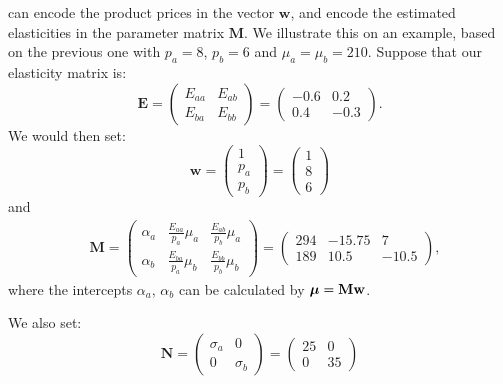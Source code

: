 \documentclass[a4paper,11pt]{article}
\begin{document}
can encode the product prices in the vector $\mathbf{w}$, and encode the estimated elasticities in the parameter matrix $\mathbf{M}$. We illustrate this on an example, based on the previous one with $p_a = 8$, $p_b = 6$ and $\mu_a = \mu_b = 210$. Suppose that our elasticity matrix is:
\[
\mathbf{E} = 
\begin{pmatrix} E_{aa} & E_{ab}\\ E_{ba} & E_{bb} \end{pmatrix}
=
\begin{pmatrix} -0.6 & 0.2\\ 0.4 & -0.3 \end{pmatrix}.
\]
We would then set:
\[
\mathbf{w} = 
\begin{pmatrix} 1\\ p_a\\ p_b \end{pmatrix} =
\begin{pmatrix} 1\\ 8\\ 6 \end{pmatrix}
\]
and
\[
\begin{aligned}
&\mathbf{M} = 
\begin{pmatrix}
\alpha_a&\frac{E_{aa}}{p_a}\mu_a&\frac{E_{ab}}{p_b}\mu_a\\
\alpha_b&\frac{E_{ba}}{p_a}\mu_b&\frac{E_{bb}}{p_b}\mu_b
\end{pmatrix} =
\begin{pmatrix}
294&-15.75&7\\
189&10.5&-10.5
\end{pmatrix},
\end{aligned}
\]
where the intercepts $\alpha_a$, $\alpha_b$ can be calculated by $\mbox{\boldmath$\mu$} = \mathbf{M}\mathbf{w}$.

We also set:
\[
\mathbf{N}=
\begin{pmatrix} \sigma_{a} & 0\\
0 & \sigma_{b} \end{pmatrix}=
\begin{pmatrix} 
25 & 0\\ 
0 & 35
\end{pmatrix}
\]
\end{document}
